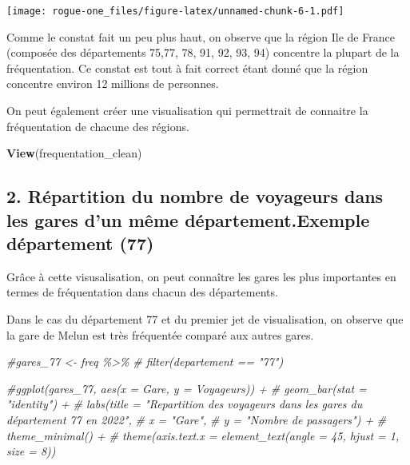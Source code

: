 \documentclass[
]{article}
\newenvironment{Shaded}{\begin{snugshade}}{\end{snugshade}}
\newcommand{\CommentTok}[1]{\textcolor[rgb]{0.56,0.35,0.01}{\textit{#1}}}
\newcommand{\FunctionTok}[1]{\textcolor[rgb]{0.13,0.29,0.53}{\textbf{#1}}}
\newcommand{\NormalTok}[1]{#1}
\begin{document}
\texttt{[image: rogue-one\_files/figure-latex/unnamed-chunk-6-1.pdf]}

Comme le constat fait un peu plus haut, on observe que la région Ile de
France (composée des départements 75,77, 78, 91, 92, 93, 94) concentre
la plupart de la fréquentation. Ce constat est tout à fait correct étant
donné que la région concentre environ 12 millions de personnes.

On peut également créer une visualisation qui permettrait de connaitre
la fréquentation de chacune des régions.

\begin{Shaded}
\begin{Highlighting}[]
\FunctionTok{View}\NormalTok{(frequentation\_clean)}
\end{Highlighting}
\end{Shaded}

\hypertarget{ruxe9partition-du-nombre-de-voyageurs-dans-les-gares-dun-muxeame-duxe9partement.exemple-duxe9partement-77}{%
\subsection{2. Répartition du nombre de voyageurs dans les gares d'un
même département.Exemple département
(77)}\label{ruxe9partition-du-nombre-de-voyageurs-dans-les-gares-dun-muxeame-duxe9partement.exemple-duxe9partement-77}}

Grâce à cette visusalisation, on peut connaître les gares les plus
importantes en termes de fréquentation dans chacun des départements.

Dans le cas du département 77 et du premier jet de visualisation, on
observe que la gare de Melun est très fréquentée comparé aux autres
gares.

\begin{Shaded}
\begin{Highlighting}[]
\CommentTok{\#gares\_77 \textless{}{-} freq \%\textgreater{}\%}
\CommentTok{\#  filter(departement == "77")}

\CommentTok{\#ggplot(gares\_77, aes(x = Gare, y = Voyageurs)) +}
\CommentTok{\#  geom\_bar(stat = "identity") +}
\CommentTok{\#  labs(title = "Repartition des voyageurs dans les gares du département 77 en 2022",}
\CommentTok{\#       x = "Gare",}
\CommentTok{\#       y = "Nombre de passagers") +}
\CommentTok{\#  theme\_minimal() +}
\CommentTok{\#  theme(axis.text.x = element\_text(angle = 45, hjust = 1, size = 8))}
\end{Highlighting}
\end{Shaded}
\end{document}
